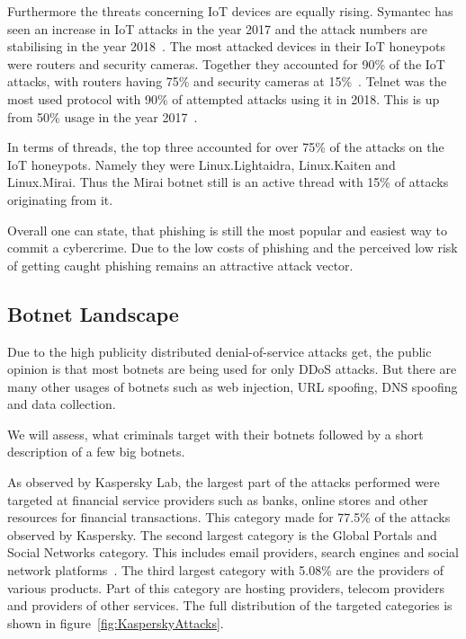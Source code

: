 Furthermore the threats concerning IoT devices are equally rising.
Symantec has seen an increase in IoT attacks in the year 2017 and the attack numbers are stabilising in the year 2018~\cite{Symantec19}.
The most attacked devices in their IoT honeypots were routers and security cameras.
Together they accounted for 90\% of the IoT attacks, with routers having 75\% and security cameras at 15\%~\cite{Symantec19}.
Telnet was the most used protocol with 90\% of attempted attacks using it in 2018.
This is up from 50\% usage in the year 2017~\cite{Symantec19}.

In terms of threads, the top three accounted for over 75\% of the attacks on the IoT honeypots.
Namely they were Linux.Lightaidra, Linux.Kaiten and Linux.Mirai.
Thus the Mirai botnet still is an active thread with 15\% of attacks originating from it.\cite{Symantec19}

Overall one can state, that phishing is still the most popular and easiest way to commit a cybercrime.
Due to the low costs of phishing and the perceived low risk of getting caught phishing remains an attractive attack vector.\cite{McAfee18}

\subsection{Botnet Landscape}

Due to the high publicity distributed denial-of-service attacks get, the public opinion is that most botnets are being used for only DDoS attacks.
But there are many other usages of botnets such as web injection, URL spoofing, DNS spoofing and data collection.\cite{Eremin19}

We will assess, what criminals target with their botnets followed by a short description of a few big botnets.

As observed by Kaspersky Lab, the largest part of the attacks performed were targeted at financial service providers such as banks, online stores and other resources for financial transactions.
This category made for 77.5\% of the attacks observed by Kaspersky.
The second largest category is the Global Portals and Social Networks category.
This includes email providers, search engines and social network platforms~\cite{Eremin19}.
The third largest category with 5.08\% are the providers of various products.
Part of this category are hosting providers, telecom providers and providers of other services.
The full distribution of the targeted categories is shown in figure~\ref{fig:KasperskyAttacks}.

